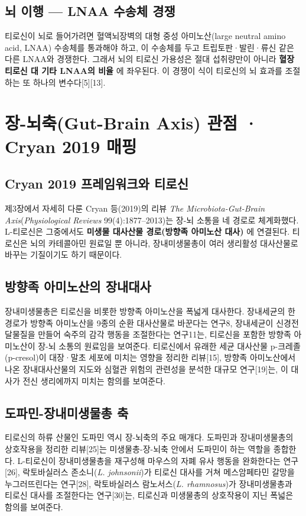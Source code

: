 \documentclass[12pt,oneside]{book}
\begin{document}
\subsection{뇌 이행 — LNAA 수송체 경쟁}

티로신이 뇌로 들어가려면 혈액뇌장벽의 대형 중성 아미노산(large neutral amino acid, LNAA) 수송체를 통과해야 하고, 이 수송체를 두고 트립토판·발린·류신 같은 다른 LNAA와 경쟁한다. 그래서 뇌의 티로신 가용성은 절대 섭취량만이 아니라 \textbf{혈장 티로신 대 기타 LNAA의 비율} 에 좌우된다. 이 경쟁이 식이 티로신의 뇌 효과를 조절하는 또 하나의 변수다[5][13].

\section{장-뇌축(Gut-Brain Axis) 관점 · Cryan 2019 매핑}

\subsection{Cryan 2019 프레임워크와 티로신}

제3장에서 자세히 다룬 Cryan 등(2019)의 리뷰 \textit{The Microbiota-Gut-Brain Axis}(\textit{Physiological Reviews} 99(4):1877–2013)는 장-뇌 소통을 네 경로로 체계화했다. L-티로신은 그중에서도 \textbf{미생물 대사산물 경로(방향족 아미노산 대사)} 에 연결된다. 티로신은 뇌의 카테콜아민 원료일 뿐 아니라, 장내미생물총이 여러 생리활성 대사산물로 바꾸는 기질이기도 하기 때문이다.

\subsection{방향족 아미노산의 장내대사}

장내미생물총은 티로신을 비롯한 방향족 아미노산을 폭넓게 대사한다. 장내세균의 한 경로가 방향족 아미노산을 9종의 순환 대사산물로 바꾼다는 연구8, 장내세균이 신경전달물질을 만들어 숙주의 감각 행동을 조절한다는 연구11는, 티로신을 포함한 방향족 아미노산이 장-뇌 소통의 원료임을 보여준다. 티로신에서 유래한 세균 대사산물 p-크레졸(p-cresol)이 대장·말초 세포에 미치는 영향을 정리한 리뷰[15], 방향족 아미노산에서 나온 장내대사산물의 지도와 심혈관 위험의 관련성을 분석한 대규모 연구[19]는, 이 대사가 전신 생리에까지 미치는 함의를 보여준다.

\subsection{도파민-장내미생물총 축}

티로신의 하류 산물인 도파민 역시 장-뇌축의 주요 매개다. 도파민과 장내미생물총의 상호작용을 정리한 리뷰[25]는 미생물총-장-뇌축 안에서 도파민이 하는 역할을 종합한다. L-티로신이 장내미생물총을 재구성해 마우스의 자폐 유사 행동을 완화한다는 연구[26], 락토바실러스 존소니(\textit{L. johnsonii})가 티로신 대사를 거쳐 메스암페타민 갈망을 누그러뜨린다는 연구[28], 락토바실러스 람노서스(\textit{L. rhamnosus})가 장내미생물총과 티로신 대사를 조절한다는 연구[30]는, 티로신과 미생물총의 상호작용이 지닌 폭넓은 함의를 보여준다.
\end{document}
